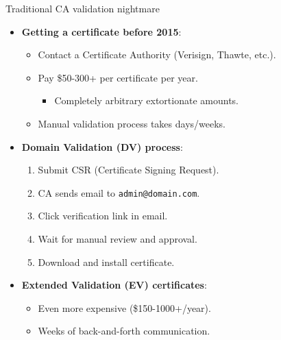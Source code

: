 \documentclass[aspectratio=169, lualatex, handout]{beamer}
\begin{document}
\begin{frame}{Traditional CA validation nightmare}
	\begin{itemize}
		\item \textbf{Getting a certificate before 2015}:
		      \begin{itemize}
			      \item Contact a Certificate Authority (Verisign, Thawte, etc.).
			      \item Pay \$50-300+ per certificate per year.
			            \begin{itemize}
				            \item Completely arbitrary extortionate amounts.
			            \end{itemize}
			      \item Manual validation process takes days/weeks.
		      \end{itemize}
		\item \textbf{Domain Validation (DV) process}:
		      \begin{enumerate}
			      \item Submit CSR (Certificate Signing Request).
			      \item CA sends email to \texttt{admin@domain.com}.
			      \item Click verification link in email.
			      \item Wait for manual review and approval.
			      \item Download and install certificate.
		      \end{enumerate}
		\item \textbf{Extended Validation (EV) certificates}:
		      \begin{itemize}
			      \item Even more expensive (\$150-1000+/year).
			      \item Weeks of back-and-forth communication.
		      \end{itemize}
	\end{itemize}
\end{frame}
\end{document}
